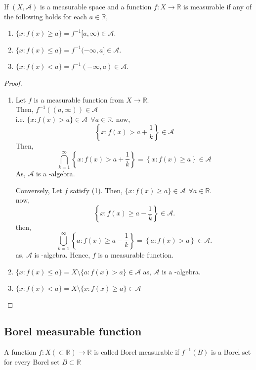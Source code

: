\begin{theorem}[]
    If $(X,\mathcal{A})$ is a measurable space and a function  $f:X\to\mathds{R}$ is measurable if any of the following holds for each $a\in\mathds{R}$,
    \begin{enumerate}
        \item $\{x:f(x)\ge a\}=f^{-1}[a,\infty)\in \mathcal{A}$.
        \item $\{x:f(x)\le a\}=f^{-1}(-\infty,a]\in \mathcal{A}$.
        \item $\{x:f(x)< a\}=f^{-1}(-\infty,a)\in \mathcal{A}$.
    \end{enumerate}
\end{theorem}

\begin{proof}
    \
    \begin{enumerate} 
        \item Let $f$ is a measurable function from  $X\to\mathds{R}$.\\
            Then, $f^{-1}((a,\infty))\in\mathcal{A}$\\
            i.e. $ \{x:f(x)>a\}\in\mathcal{A}\ \ \forall a \in\mathds{R}$.
            now,
            \[
                \left\{ x:f(x)>a+\frac{1}{k} \right\}\in\mathcal{A} 
            \]
            Then,
            \[
                \bigcap_{k=1}^{\infty}\left\{ x:f(x)>a+\frac{1}{k} \right\}=\left\{ x:f(x)\ge a \right\}\in\mathcal{A}  
            \]
            As, $\mathcal{A}$ is a \sig-algebra.

            Conversely, Let $f$ satisfy (1). Then, $\{x:f(x)\ge a\}\in\mathcal{A} \ \ \forall a\in\mathds{R}$.\\
            now, 
            \[
                \left\{ x:f(x)\ge a-\frac{1}{k} \right\}\in\mathcal{A}. 
            \]
            then,
            \[
                \bigcup_{k=1}^{\infty}\left\{ a:f(x)\ge a-\frac{1}{k} \right\}=\left\{ a:f(x)>a \right\}\in\mathcal{A}.  
            \]
            as, $\mathcal{A}$ is \sig-algebra.
            Hence, $f$ is a measurable function.
        \item $\{x:f(x)\le a\}=X\setminus\{a:f(x)>a\}\in\mathcal{A}$ as, $\mathcal{A}$ is a \sig-algebra.
        \item $\{x:f(x)<a\}=X\setminus\{x:f(x)\ge a\}\in\mathcal{A}$
    \end{enumerate}
\end{proof}


\subsection{Borel measurable function}
\begin{definition}
    A function $f:X(\subset\mathds{R})\to\mathds{R}$ is called Borel measurable if $f^{-1}(B)$ is a Borel set for every Borel set $B\subset\mathds{R}$
\end{definition}

